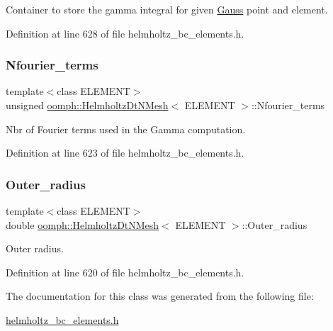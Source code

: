 Container to store the gamma integral for given \hyperlink{classoomph_1_1Gauss}{Gauss} point and element. 



Definition at line 628 of file helmholtz\+\_\+bc\+\_\+elements.\+h.

\mbox{\label{classoomph_1_1HelmholtzDtNMesh_a606cf4e783b8dc36f3c059c4ec8ac503}} 
\subsubsection{\texorpdfstring{Nfourier\+\_\+terms}{Nfourier\_terms}}
{\footnotesize\ttfamily template$<$class E\+L\+E\+M\+E\+NT$>$ \\
unsigned \hyperlink{classoomph_1_1HelmholtzDtNMesh}{oomph\+::\+Helmholtz\+Dt\+N\+Mesh}$<$ E\+L\+E\+M\+E\+NT $>$\+::Nfourier\+\_\+terms\hspace{0.3cm}{\ttfamily [private]}}



Nbr of Fourier terms used in the Gamma computation. 



Definition at line 623 of file helmholtz\+\_\+bc\+\_\+elements.\+h.

\mbox{\label{classoomph_1_1HelmholtzDtNMesh_abcc058c646023fbde29369b858d12e8e}} 
\subsubsection{\texorpdfstring{Outer\+\_\+radius}{Outer\_radius}}
{\footnotesize\ttfamily template$<$class E\+L\+E\+M\+E\+NT$>$ \\
double \hyperlink{classoomph_1_1HelmholtzDtNMesh}{oomph\+::\+Helmholtz\+Dt\+N\+Mesh}$<$ E\+L\+E\+M\+E\+NT $>$\+::Outer\+\_\+radius\hspace{0.3cm}{\ttfamily [private]}}



Outer radius. 



Definition at line 620 of file helmholtz\+\_\+bc\+\_\+elements.\+h.



The documentation for this class was generated from the following file\+:\begin{DoxyCompactItemize}
\item 
\hyperlink{helmholtz__bc__elements_8h}{helmholtz\+\_\+bc\+\_\+elements.\+h}\end{DoxyCompactItemize}
